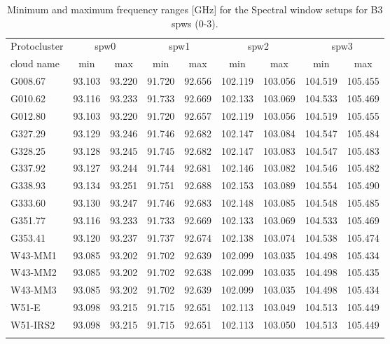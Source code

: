 \begin{table}[htbp!]
\centering
\caption{Minimum and maximum frequency ranges [GHz] for the Spectral window setups for B3 spws (0-3).}
\label{tab:spwsfreq}

\begin{tabular}{@{\extracolsep{6pt}}lcccccccc@{}}
\hline \noalign {\smallskip}
Protocluster  & \multicolumn{2}{c}{spw0} & \multicolumn{2}{c}{spw1} & \multicolumn{2}{c}{spw2}& \multicolumn{2}{c}{spw3} \\ 
\cline{2-3}\cline{4-5}\cline{6-7}\cline{8-9}
cloud name\tnote{1}  & min & max  & min & max  & min & max  & min & max  \\
\hline \noalign {\smallskip}

G008.67 & 93.103&93.220&91.720&92.656&102.119&103.056&104.519&105.455 \\
G010.62 & 93.116&93.233&91.733&92.669&102.133&103.069&104.533&105.469 \\
G012.80 & 93.103&93.220&91.720&92.657&102.119&103.056&104.519&105.455 \\
G327.29 & 93.129&93.246&91.746&92.682&102.147&103.084&104.547&105.484 \\
G328.25 & 93.128&93.245&91.745&92.682&102.147&103.083&104.547&105.483 \\
G337.92 & 93.127&93.244&91.744&92.681&102.146&103.082&104.546&105.482 \\
G338.93 & 93.134&93.251&91.751&92.688&102.153&103.089&104.554&105.490 \\
G333.60 & 93.130&93.247&91.746&92.683&102.148&103.085&104.548&105.485 \\
G351.77 & 93.116&93.233&91.733&92.669&102.133&103.069&104.533&105.469 \\
G353.41 & 93.120&93.237&91.737&92.674&102.138&103.074&104.538&105.474 \\
W43-MM1 & 93.085&93.202&91.702&92.639&102.099&103.035&104.498&105.434 \\
W43-MM2 & 93.085&93.202&91.702&92.638&102.099&103.035&104.498&105.435 \\
W43-MM3 & 93.085&93.202&91.702&92.639&102.099&103.035&104.498&105.434 \\
W51-E & 93.098&93.215&91.715&92.651&102.113&103.049&104.513&105.449 \\
W51-IRS2 & 93.098&93.215&91.715&92.651&102.113&103.050&104.513&105.449 \\

\hline \noalign {\smallskip}
\end{tabular}

%
\end{table}
